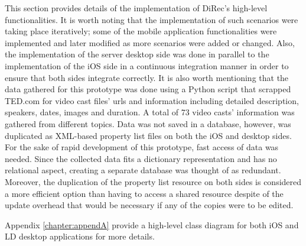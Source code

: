 This section provides details of the implementation of DiRec's high-level
functionalities. It is worth noting that the implementation of such scenarios
were taking place iteratively; some of the mobile application functionalities
were implemented and later modified as more
scenarios were added or changed. Also, the implementation of the server desktop
side was done in parallel to the implementation of the iOS side in a continuous
integration manner in order to ensure that both sides integrate correctly. It is
also worth mentioning that the data gathered for this prototype was done using a
Python script that scrapped TED.com for video cast files' urls and information
including detailed description, speakers, dates, images and duration. A total of
73 video casts' information was gathered from different topics. Data was not
saved in a database, however, was duplicated as XML-based property list files on
both the iOS and desktop sides. For the sake of rapid development of this
prototype, fast access of data was needed. Since the collected data fits a
dictionary representation and has no relational aspect, creating a separate
database was thought of as redundant. Moreover, the duplication of the property
list resource on both sides is considered a more efficient option than having
to access a shared resource despite of the update overhead that would be necessary if any of the copies were to be edited.\par
Appendix \ref{chapter:appendA} provide a high-level class diagram for both iOS
and LD desktop applications for more details.

